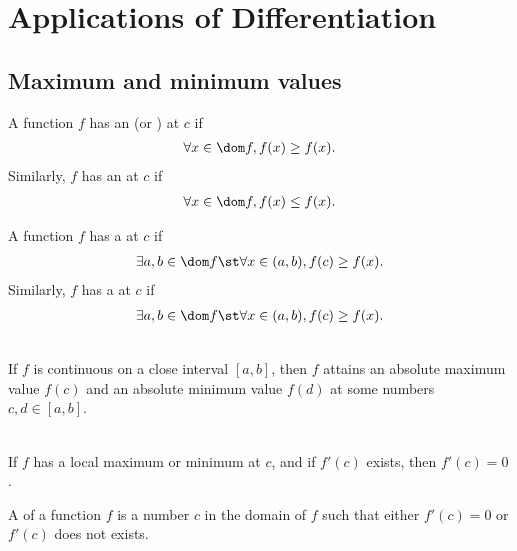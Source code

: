 \documentclass{article}
\begin{document}
\section{Applications of Differentiation}
\subsection{Maximum and minimum values}
\begin{definition}
    A function $f$ has an  (or ) at $c$ if
    \begin{align*}
        \forall x\in \dom f, f(x)\geq f(x).
    \end{align*} 
    Similarly, $f$ has an  at $c$ if
    \begin{align*}
        \forall x\in \dom f, f(x)\leq f(x).
    \end{align*}
\end{definition}
\begin{definition}
    A function $f$ has a  at $c$ if
    \begin{align*}
        \exists a,b\in \dom f \st \forall x\in (a,b), f(c)\geq f(x). 
    \end{align*}
    Similarly, $f$ has a  at $c$ if
    \begin{align*}
        \exists a,b\in \dom f\st \forall x\in(a,b), f(c)\geq f(x).
    \end{align*}
\end{definition}
\begin{theorem}
    \\
    If $f$ is continuous on a close interval $[a,b]$, then $f$ attains an absolute maximum value $f(c)$ and an absolute minimum value $f(d)$ at some numbers $c,d\in[a,b]$.
\end{theorem}
\begin{theorem}
    \\
    If $f$ has a local maximum or minimum at $c$, and if $f'(c)$ exists, then $f'(c)=0$.
\end{theorem}
\begin{definition}
    A  of a function $f$ is a number $c$ in the domain of $f$ such that either $f'(c)=0$ or $f'(c)$ does not exists.
\end{definition}
\end{document}
